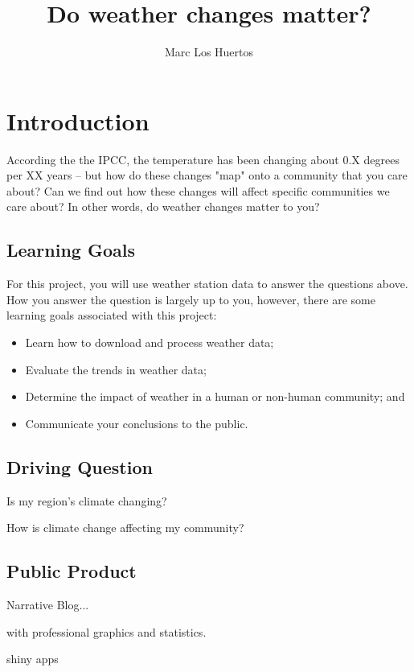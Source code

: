 \documentclass{article}\usepackage[]{graphicx}\usepackage[]{color}
\title{Do weather changes matter?}
\author{Marc Los Huertos}
\begin{document}
\maketitle

\section{Introduction}

According the the IPCC, the temperature has been changing about 0.X degrees per XX years -- but how do these changes "map" onto a community that you care about?  Can we find out how these changes will affect specific communities we care about? In other words, do weather changes matter to you?

\subsection{Learning Goals}

For this project, you will use weather station data to answer the questions above. How you answer the question is largely up to you, however, there are some learning goals associated with this project:

\begin{itemize}
  \item Learn how to download and process weather data;
  \item Evaluate the trends in weather data;
  \item Determine the impact of weather in a human or non-human community; and
  \item Communicate your conclusions to the public.
\end{itemize}

\subsection{Driving Question}

Is my region's climate changing?

How is climate change affecting my community?

\subsection{Public Product}

Narrative Blog...

with professional graphics and statistics.

shiny apps
\end{document}
